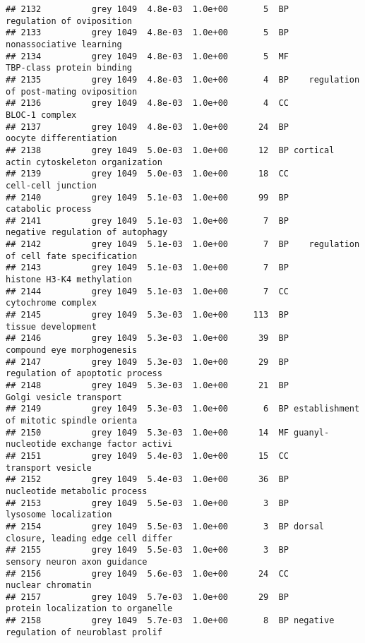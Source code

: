 \documentclass[]{article}
\begin{document}
\begin{verbatim}
## 2132          grey 1049  4.8e-03  1.0e+00       5  BP                regulation of oviposition
## 2133          grey 1049  4.8e-03  1.0e+00       5  BP                  nonassociative learning
## 2134          grey 1049  4.8e-03  1.0e+00       5  MF                TBP-class protein binding
## 2135          grey 1049  4.8e-03  1.0e+00       4  BP    regulation of post-mating oviposition
## 2136          grey 1049  4.8e-03  1.0e+00       4  CC                           BLOC-1 complex
## 2137          grey 1049  4.8e-03  1.0e+00      24  BP                   oocyte differentiation
## 2138          grey 1049  5.0e-03  1.0e+00      12  BP cortical actin cytoskeleton organization
## 2139          grey 1049  5.0e-03  1.0e+00      18  CC                       cell-cell junction
## 2140          grey 1049  5.1e-03  1.0e+00      99  BP                        catabolic process
## 2141          grey 1049  5.1e-03  1.0e+00       7  BP         negative regulation of autophagy
## 2142          grey 1049  5.1e-03  1.0e+00       7  BP    regulation of cell fate specification
## 2143          grey 1049  5.1e-03  1.0e+00       7  BP                histone H3-K4 methylation
## 2144          grey 1049  5.1e-03  1.0e+00       7  CC                       cytochrome complex
## 2145          grey 1049  5.3e-03  1.0e+00     113  BP                       tissue development
## 2146          grey 1049  5.3e-03  1.0e+00      39  BP               compound eye morphogenesis
## 2147          grey 1049  5.3e-03  1.0e+00      29  BP          regulation of apoptotic process
## 2148          grey 1049  5.3e-03  1.0e+00      21  BP                  Golgi vesicle transport
## 2149          grey 1049  5.3e-03  1.0e+00       6  BP establishment of mitotic spindle orienta
## 2150          grey 1049  5.3e-03  1.0e+00      14  MF guanyl-nucleotide exchange factor activi
## 2151          grey 1049  5.4e-03  1.0e+00      15  CC                        transport vesicle
## 2152          grey 1049  5.4e-03  1.0e+00      36  BP             nucleotide metabolic process
## 2153          grey 1049  5.5e-03  1.0e+00       3  BP                    lysosome localization
## 2154          grey 1049  5.5e-03  1.0e+00       3  BP dorsal closure, leading edge cell differ
## 2155          grey 1049  5.5e-03  1.0e+00       3  BP             sensory neuron axon guidance
## 2156          grey 1049  5.6e-03  1.0e+00      24  CC                        nuclear chromatin
## 2157          grey 1049  5.7e-03  1.0e+00      29  BP        protein localization to organelle
## 2158          grey 1049  5.7e-03  1.0e+00       8  BP negative regulation of neuroblast prolif

\end{verbatim}
\end{document}
